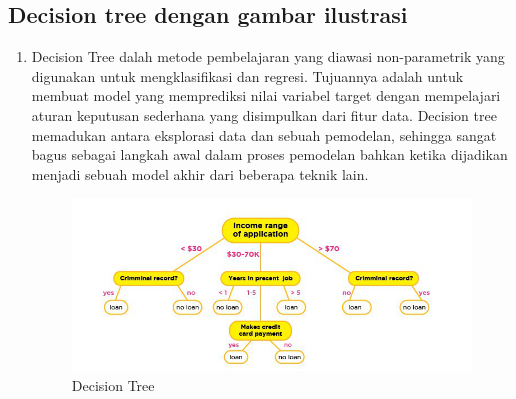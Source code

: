 \subsection{Decision tree dengan gambar ilustrasi}
\begin{enumerate}
\item Decision Tree dalah metode pembelajaran yang diawasi non-parametrik yang digunakan untuk mengklasifikasi dan regresi. Tujuannya adalah untuk membuat model yang memprediksi nilai variabel target dengan mempelajari aturan keputusan sederhana yang disimpulkan dari fitur data. Decision tree memadukan antara eksplorasi data dan sebuah pemodelan, sehingga sangat bagus sebagai langkah awal dalam proses pemodelan bahkan ketika dijadikan menjadi sebuah model akhir dari beberapa teknik lain.\\
\begin{figure}[ht]
\centering
\includegraphics[scale=0.5]{figures/7mrdt.png}
\caption{Decision Tree}
\label{contoh}
\end{figure}
\end{enumerate}

